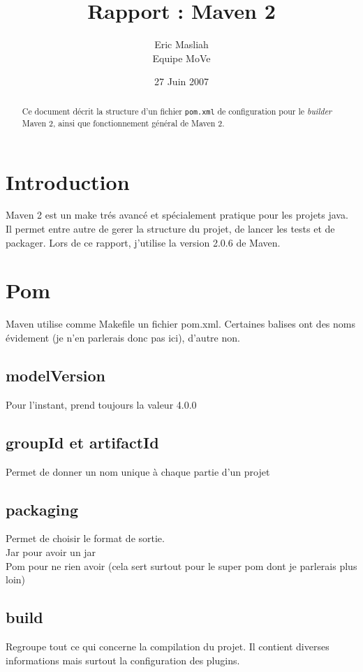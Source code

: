 \documentclass[a4paper,10pt]{article}
\title{Rapport : Maven 2}
\author{Eric Masliah\\
Equipe MoVe}
\date{27 Juin 2007}
\begin{document}
\maketitle

\begin{abstract}
Ce document décrit la structure d'un fichier \texttt{pom.xml} de configuration pour le \textit{builder} Maven 2, ainsi que fonctionnement général de Maven 2.
\end{abstract}


\section{Introduction}
Maven 2 est un make trés avancé et spécialement pratique pour les projets java.
Il permet entre autre de gerer la structure du projet, de lancer les tests et de packager.
Lors de ce rapport, j'utilise la version 2.0.6 de Maven.


\section{Pom}
Maven utilise comme Makefile un fichier pom.xml. Certaines balises ont des noms évidement (je n'en parlerais donc pas ici), d'autre non.

\subsection{modelVersion}
Pour l'instant, prend toujours la valeur 4.0.0

\subsection{groupId et artifactId}
Permet de donner un nom unique à chaque partie d'un projet

\subsection{packaging}
Permet de choisir le format de sortie.\\
Jar pour avoir un jar\\
Pom pour ne rien avoir (cela sert surtout pour le super pom dont je parlerais plus loin)

\subsection{build}
Regroupe tout ce qui concerne la compilation du projet. Il contient diverses informations mais surtout la configuration des plugins.
\end{document}
